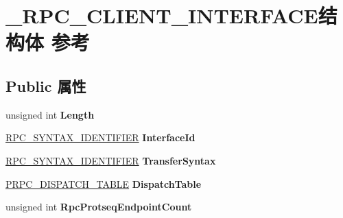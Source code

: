 \hypertarget{struct___r_p_c___c_l_i_e_n_t___i_n_t_e_r_f_a_c_e}{}\section{\+\_\+\+R\+P\+C\+\_\+\+C\+L\+I\+E\+N\+T\+\_\+\+I\+N\+T\+E\+R\+F\+A\+C\+E结构体 参考}
\label{struct___r_p_c___c_l_i_e_n_t___i_n_t_e_r_f_a_c_e}
\subsection*{Public 属性}
\begin{DoxyCompactItemize}
\item 
\mbox{\label{struct___r_p_c___c_l_i_e_n_t___i_n_t_e_r_f_a_c_e_acb599486379dd713df8c96d7e26ccc85}} 
unsigned int {\bfseries Length}
\item 
\mbox{\label{struct___r_p_c___c_l_i_e_n_t___i_n_t_e_r_f_a_c_e_a60455d758da1eecc71a364406c79d8dd}} 
\hyperlink{struct___r_p_c___s_y_n_t_a_x___i_d_e_n_t_i_f_i_e_r}{R\+P\+C\+\_\+\+S\+Y\+N\+T\+A\+X\+\_\+\+I\+D\+E\+N\+T\+I\+F\+I\+ER} {\bfseries Interface\+Id}
\item 
\mbox{\label{struct___r_p_c___c_l_i_e_n_t___i_n_t_e_r_f_a_c_e_a8e824c87ccf61edeee595efa32e24bb7}} 
\hyperlink{struct___r_p_c___s_y_n_t_a_x___i_d_e_n_t_i_f_i_e_r}{R\+P\+C\+\_\+\+S\+Y\+N\+T\+A\+X\+\_\+\+I\+D\+E\+N\+T\+I\+F\+I\+ER} {\bfseries Transfer\+Syntax}
\item 
\mbox{\label{struct___r_p_c___c_l_i_e_n_t___i_n_t_e_r_f_a_c_e_a9db8d61b8cea9a364dae35cd64689259}} 
\hyperlink{struct_r_p_c___d_i_s_p_a_t_c_h___t_a_b_l_e}{P\+R\+P\+C\+\_\+\+D\+I\+S\+P\+A\+T\+C\+H\+\_\+\+T\+A\+B\+LE} {\bfseries Dispatch\+Table}
\item 
\mbox{\label{struct___r_p_c___c_l_i_e_n_t___i_n_t_e_r_f_a_c_e_a4ad8200d9e434e98dfd6ba3fecebbf97}} 
unsigned int {\bfseries Rpc\+Protseq\+Endpoint\+Count}
\item 
\mbox{\label{struct___r_p_c___c_l_i_e_n_t___i_n_t_e_r_f_a_c_e_a98fc3d1535d3c16d0d0dbcf832c8a861}} 

\end{DoxyCompactItemize}
